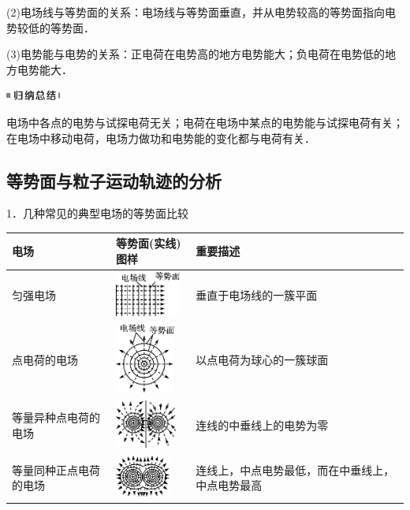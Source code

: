 (2)电场线与等势面的关系：电场线与等势面垂直，并从电势较高的等势面指向电势较低的等势面．

(3)电势能与电势的关系：正电荷在电势高的地方电势能大；负电荷在电势低的地方电势能大．



\begin{center}\includegraphics[width=0.70833in,height=0.125in]{media/image13.png}\end{center}
电场中各点的电势与试探电荷无关；电荷在电场中某点的电势能与试探电荷有关；在电场中移动电荷，电场力做功和电势能的变化都与电荷有关．
\newpage
\subsection{等势面与粒子运动轨迹的分析}

1．几种常见的典型电场的等势面比较

\begin{longtable}[]{@{}m{3cm}m{4cm}m{5cm}@{}}
\toprule
电场 & 等势面(实线)图样 & 重要描述\tabularnewline
\midrule
\endhead
匀强电场 & \includegraphics[width=0.84375in,height=0.58333in]{media/image276.png} &垂直于电场线的一簇平面\tabularnewline
点电荷的电场 &\includegraphics[width=0.77083in,height=0.90625in]{media/image277.png} &以点电荷为球心的一簇球面\tabularnewline

等量异种点电荷的电场& \includegraphics[width=0.79167in,height=0.625in]{media/image278.png}& 连线的中垂线上的电势为零\tabularnewline

等量同种正点电荷的电场& \includegraphics[width=0.70833in,height=0.55208in]{media/image279.png}& 连线上，中点电势最低，而在中垂线上，中点电势最高\tabularnewline
\bottomrule
\end{longtable}

